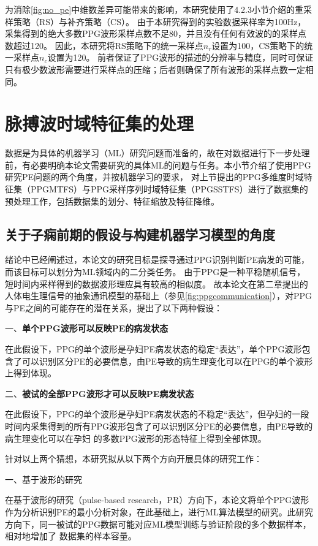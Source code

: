 为消除\autoref{fig:no_pe}中维数差异可能带来的影响，本研究使用了4.2.3小节介绍的重采样策略（RS）与补齐策略（CS）。
由于本研究得到的实验数据采样率为100Hz，采集得到的绝大多数PPG波形采样点数不足80，并且没有任何有效波的的采样点数超过120。
因此，本研究将RS策略下的统一采样点$n_r$设置为100，CS策略下的统一采样点$n_c$设置为120。
前者保证了PPG波形的描述的分辨率与精度，同时可保证只有极少数波形需要进行采样点的压缩；后者则确保了所有波形的采样点数一定相同。

\section{脉搏波时域特征集的处理}
数据是为具体的机器学习（ML）研究问题而准备的，故在对数据进行下一步处理前，有必要明确本论文需要研究的具体ML的问题与任务。本小节介绍了使用PPG研究PE问题的两个角度，并按机器学习的要求，
对上节提出的PPG多维度时域特征集（PPGMTFS）与PPG采样序列时域特征集（PPGSSTFS）进行了数据集的预处理工作，包括数据集的划分、特征缩放及特征降维。

\subsection{关于子痫前期的假设与构建机器学习模型的角度}
绪论中已经阐述过，本论文的研究目标是探寻通过PPG识别判断PE病发的可能，而该目标可以划分为ML领域内的二分类任务。
由于PPG是一种平稳随机信号，短时间内采样得到的数据波形理应具有较高的相似度\cite{Qiu2012,PPGYY,Ma2015}。
故本论文在第二章提出的人体电生理信号的抽象通讯模型的基础上（参见\autoref{fig:ppgcommunication}），对PPG与PE之间的可能存在的潜在关系，提出了以下两种假设：

一、\textbf{单个PPG波形可以反映PE的病发状态}

在此假设下，PPG的单个波形是孕妇PE病发状态的稳定“表达”，单个PPG波形包含了可以识别区分PE的必要信息，由PE导致的病生理变化可以在PPG的单个波形上得到体现。

二、\textbf{被试的全部PPG波形才可以反映PE病发状态}

在此假设下，PPG的单个波形是孕妇PE病发状态的不稳定“表达”，但孕妇的一段时间内采集得到的所有PPG波形包含了可以识别区分PE的必要信息，由PE导致的病生理变化可以在孕妇
的多数PPG波形的形态特征上得到全部体现。

针对以上两个猜想，本研究拟从以下两个方向开展具体的研究工作：

一、基于波形的研究

在基于波形的研究（pulse-based research，PR）方向下，本论文将单个PPG波形作为分析识别PE的最小分析对象，在此基础上，进行ML算法模型的研究。此研究方向下，同一被试的PPG数据可能对应ML模型训练与验证阶段的多个数据样本，相对地增加了
数据集的样本容量。

